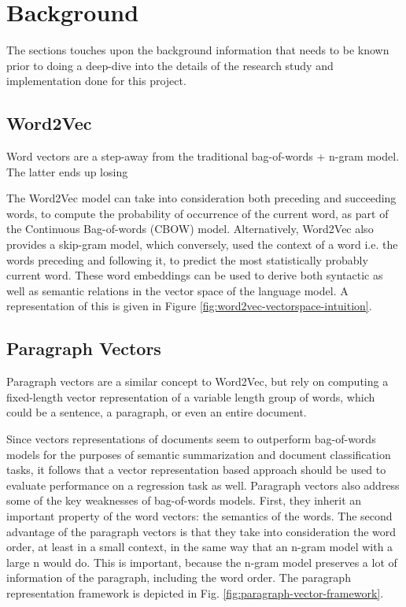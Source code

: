 \documentclass[conference]{IEEEtran}
\begin{document}
\section{Background}
    The sections touches upon the background information that needs to be known prior to doing a deep-dive into the details of the research study and implementation done for this project.

    \subsection{Word2Vec} \label{Word2Vec}
        Word vectors are a step-away from the traditional bag-of-words + n-gram model. The latter ends up losing

        The Word2Vec model\cite{mikolov2013efficient} can take into consideration both preceding and succeeding words, to compute the probability of occurrence of the current word, as part of the Continuous Bag-of-words (CBOW) model. Alternatively, Word2Vec also provides a skip-gram model\cite{mikolov2013distributed}, which conversely, used the context of a word i.e. the words preceding and following it, to predict the most statistically probably current word. These word embeddings can be used to derive both syntactic as well as semantic relations in the vector space of the language model. A representation of this is given in Figure \ref{fig:word2vec-vectorspace-intuition}.

    \subsection{Paragraph Vectors}
        Paragraph vectors are a similar concept to Word2Vec, but rely on computing a fixed-length vector representation of a variable length group of words, which could be a sentence, a paragraph, or even an entire document.

        Since vectors representations of documents seem to outperform bag-of-words models for the purposes of semantic summarization and document classification tasks, it follows that a vector representation based approach should be used to evaluate performance on a regression task as well. Paragraph vectors also address some of the key weaknesses of bag-of-words models. First, they inherit an important property of the word vectors: the semantics of the words. The second advantage of the paragraph vectors is that they take into consideration the word order, at least in a small context, in the same way that an n-gram model with a large n would do. This is important, because the n-gram model preserves a lot of information of the paragraph, including the word order\cite{le2014distributed}. The paragraph representation framework is depicted in Fig. \ref{fig:paragraph-vector-framework}.
\end{document}
